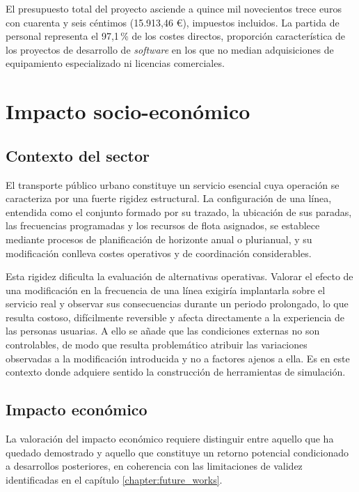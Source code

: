 El presupuesto total del proyecto asciende a quince mil novecientos trece euros con
cuarenta y seis céntimos (15.913,46 €), impuestos incluidos. La partida de personal
representa el 97,1\,\% de los costes directos, proporción característica de los proyectos
de desarrollo de \textit{software} en los que no median adquisiciones de equipamiento
especializado ni licencias comerciales.

\section{Impacto socio-económico}

\subsection{Contexto del sector}

El transporte público urbano constituye un servicio esencial cuya operación se caracteriza
por una fuerte rigidez estructural. La configuración de una línea, entendida como el
conjunto formado por su trazado, la ubicación de sus paradas, las frecuencias programadas
y los recursos de flota asignados, se establece mediante procesos de planificación de
horizonte anual o plurianual, y su modificación conlleva costes operativos y de
coordinación considerables.

Esta rigidez dificulta la evaluación de alternativas operativas. Valorar el efecto de una
modificación en la frecuencia de una línea exigiría implantarla sobre el servicio real y
observar sus consecuencias durante un periodo prolongado, lo que resulta costoso,
difícilmente reversible y afecta directamente a la experiencia de las personas usuarias.
A ello se añade que las condiciones externas no son controlables, de modo que resulta
problemático atribuir las variaciones observadas a la modificación introducida y no a
factores ajenos a ella. Es en este contexto donde adquiere sentido la construcción de
herramientas de simulación.

\subsection{Impacto económico}

La valoración del impacto económico requiere distinguir entre aquello que ha quedado
demostrado y aquello que constituye un retorno potencial condicionado a desarrollos
posteriores, en coherencia con las limitaciones de validez identificadas en el
capítulo \ref{chapter:future_works}.

